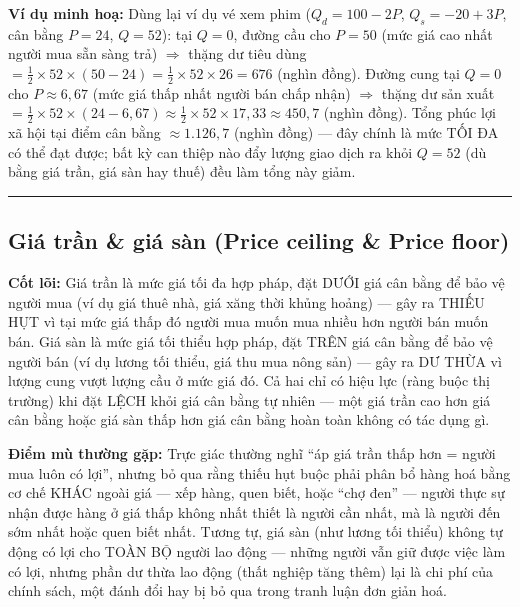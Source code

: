 \documentclass[
]{article}
\begin{document}
\textbf{Ví dụ minh hoạ:} Dùng lại ví dụ vé xem phim (\(Q_d = 100 - 2P\),
\(Q_s = -20 + 3P\), cân bằng \(P = 24\), \(Q = 52\)): tại \(Q = 0\),
đường cầu cho \(P = 50\) (mức giá cao nhất người mua sẵn sàng trả)
\(\Rightarrow\) thặng dư tiêu dùng
\(= \frac{1}{2} \times 52 \times (50 - 24) = \frac{1}{2} \times 52 \times 26 = 676\)
(nghìn đồng). Đường cung tại \(Q = 0\) cho \(P \approx 6{,}67\) (mức giá
thấp nhất người bán chấp nhận) \(\Rightarrow\) thặng dư sản xuất
\(= \frac{1}{2} \times 52 \times (24 - 6{,}67) \approx \frac{1}{2} \times 52 \times 17{,}33 \approx 450{,}7\)
(nghìn đồng). Tổng phúc lợi xã hội tại điểm cân bằng
\(\approx 1.126{,}7\) (nghìn đồng) --- đây chính là mức TỐI ĐA có thể
đạt được; bất kỳ can thiệp nào đẩy lượng giao dịch ra khỏi \(Q = 52\)
(dù bằng giá trần, giá sàn hay thuế) đều làm tổng này giảm.

\begin{center}\rule{0.5\linewidth}{0.5pt}\end{center}

\subsection{Giá trần \& giá sàn (Price ceiling \& Price
floor)}\label{giuxe1-trux1ea7n-giuxe1-suxe0n-price-ceiling-price-floor}

\textbf{Cốt lõi:} Giá trần là mức giá tối đa hợp pháp, đặt DƯỚI giá cân
bằng để bảo vệ người mua (ví dụ giá thuê nhà, giá xăng thời khủng hoảng)
--- gây ra THIẾU HỤT vì tại mức giá thấp đó người mua muốn mua nhiều hơn
người bán muốn bán. Giá sàn là mức giá tối thiểu hợp pháp, đặt TRÊN giá
cân bằng để bảo vệ người bán (ví dụ lương tối thiểu, giá thu mua nông
sản) --- gây ra DƯ THỪA vì lượng cung vượt lượng cầu ở mức giá đó. Cả
hai chỉ có hiệu lực (ràng buộc thị trường) khi đặt LỆCH khỏi giá cân
bằng tự nhiên --- một giá trần cao hơn giá cân bằng hoặc giá sàn thấp
hơn giá cân bằng hoàn toàn không có tác dụng gì.

\textbf{Điểm mù thường gặp:} Trực giác thường nghĩ ``áp giá trần thấp
hơn = người mua luôn có lợi'', nhưng bỏ qua rằng thiếu hụt buộc phải
phân bổ hàng hoá bằng cơ chế KHÁC ngoài giá --- xếp hàng, quen biết,
hoặc ``chợ đen'' --- người thực sự nhận được hàng ở giá thấp không nhất
thiết là người cần nhất, mà là người đến sớm nhất hoặc quen biết nhất.
Tương tự, giá sàn (như lương tối thiểu) không tự động có lợi cho TOÀN BỘ
người lao động --- những người vẫn giữ được việc làm có lợi, nhưng phần
dư thừa lao động (thất nghiệp tăng thêm) lại là chi phí của chính sách,
một đánh đổi hay bị bỏ qua trong tranh luận đơn giản hoá.
\end{document}
